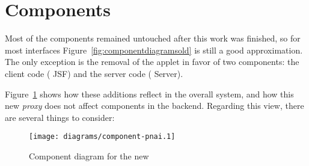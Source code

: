 \section{Components} %
\label{sec:components}

Most of the components remained untouched after this work was finished, so for most interfaces Figure~\ref{fig:componentdiagramsold} is still a good approximation.
The only exception is the removal of the  applet in favor of two  components: the client code ( JSF) and the server code ( Server).

Figure~\ref{fig:componentdiagrams} shows how these additions reflect in the overall system, and how this new \emph{proxy} does not affect components in the backend.
Regarding this view, there are several things to consider:

\begin{figure}[htbp]
  \centering
    \texttt{[image: diagrams/component-pnai.1]}
  \caption{Component diagram for the new }
  \label{fig:componentdiagrams}
\end{figure}


